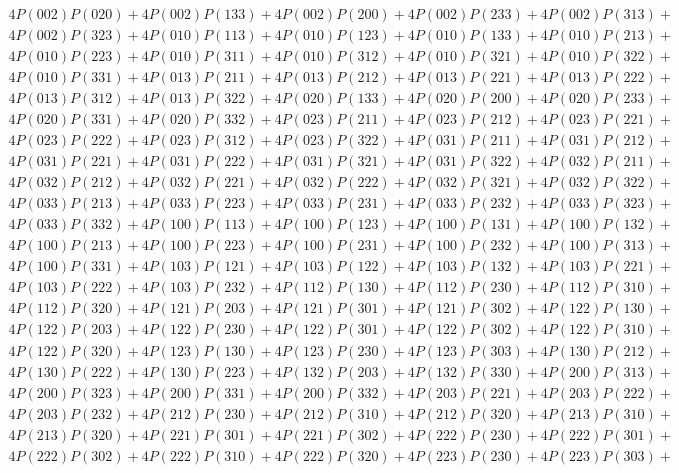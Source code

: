 \begin{align*}
	4P(002)P(020) + 4P(002)P(133) + 4P(002)P(200) + 4P(002)P(233) + 4P(002)P(313)+ \\
	4P(002)P(323) + 4P(010)P(113) + 4P(010)P(123) + 4P(010)P(133) + 4P(010)P(213)+ \\
	4P(010)P(223) + 4P(010)P(311) + 4P(010)P(312) + 4P(010)P(321) + 4P(010)P(322)+ \\
	4P(010)P(331) + 4P(013)P(211) + 4P(013)P(212) + 4P(013)P(221) + 4P(013)P(222)+ \\
	4P(013)P(312) + 4P(013)P(322) + 4P(020)P(133) + 4P(020)P(200) + 4P(020)P(233)+ \\
	4P(020)P(331) + 4P(020)P(332) + 4P(023)P(211) + 4P(023)P(212) + 4P(023)P(221)+ \\
	4P(023)P(222) + 4P(023)P(312) + 4P(023)P(322) + 4P(031)P(211) + 4P(031)P(212)+ \\
	4P(031)P(221) + 4P(031)P(222) + 4P(031)P(321) + 4P(031)P(322) + 4P(032)P(211)+ \\
	4P(032)P(212) + 4P(032)P(221) + 4P(032)P(222) + 4P(032)P(321) + 4P(032)P(322)+ \\
	4P(033)P(213) + 4P(033)P(223) + 4P(033)P(231) + 4P(033)P(232) + 4P(033)P(323)+ \\
	4P(033)P(332) + 4P(100)P(113) + 4P(100)P(123) + 4P(100)P(131) + 4P(100)P(132)+ \\
	4P(100)P(213) + 4P(100)P(223) + 4P(100)P(231) + 4P(100)P(232) + 4P(100)P(313)+ \\
	4P(100)P(331) + 4P(103)P(121) + 4P(103)P(122) + 4P(103)P(132) + 4P(103)P(221)+ \\
	4P(103)P(222) + 4P(103)P(232) + 4P(112)P(130) + 4P(112)P(230) + 4P(112)P(310)+ \\
	4P(112)P(320) + 4P(121)P(203) + 4P(121)P(301) + 4P(121)P(302) + 4P(122)P(130)+ \\
	4P(122)P(203) + 4P(122)P(230) + 4P(122)P(301) + 4P(122)P(302) + 4P(122)P(310)+ \\
	4P(122)P(320) + 4P(123)P(130) + 4P(123)P(230) + 4P(123)P(303) + 4P(130)P(212)+ \\
	4P(130)P(222) + 4P(130)P(223) + 4P(132)P(203) + 4P(132)P(330) + 4P(200)P(313)+ \\
	4P(200)P(323) + 4P(200)P(331) + 4P(200)P(332) + 4P(203)P(221) + 4P(203)P(222)+ \\
	4P(203)P(232) + 4P(212)P(230) + 4P(212)P(310) + 4P(212)P(320) + 4P(213)P(310)+ \\
	4P(213)P(320) + 4P(221)P(301) + 4P(221)P(302) + 4P(222)P(230) + 4P(222)P(301)+ \\
	4P(222)P(302) + 4P(222)P(310) + 4P(222)P(320) + 4P(223)P(230) + 4P(223)P(303)+ \\

\end{align*}
